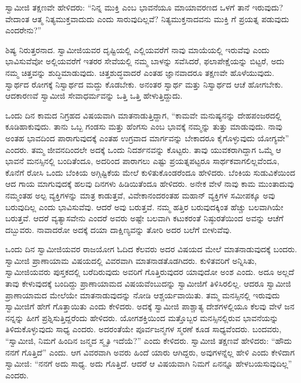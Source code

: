  ಸ್ವಾಮೀಜಿ ತಕ್ಷಣವೇ ಹೇಳಿದರು: “ನಿನ್ನ ಮುಕ್ತಿ ಎಂಬ ಭಾವನೆಯೂ ಮಾಯಾವರಣದ ಒಳಗೆ ತಾನೆ ಇರುವುದು? ವೇದಾಂತ ಆತ್ಮ ನಿತ್ಯಮುಕ್ತವಾದುದು ಎಂದು ಸಾರುವುದಿಲ್ಲವೆ? ನಿತ್ಯಮುಕ್ತನಾದವನು ಮುಕ್ತಿ ಗೆ ಪ್ರಯತ್ನ ಪಡುವುದು ಎಂದರೇನು?” 

 ಶಿಷ್ಯ ನಿರುತ್ತರನಾದ. ಸ್ವಾಮೀಜಿಯವರ ದೃಷ್ಟಿಯಲ್ಲಿ ಎಲ್ಲಿಯವರೆಗೆ ನಾವು ಮಾಯೆಯಲ್ಲಿ ಇರುವೆವು ಎಂದು ಭಾವಿಸುವೆವೋ ಅಲ್ಲಿಯವರೆಗೆ ಇತರರ ಸೇವೆಯಲ್ಲಿ ನಮ್ಮ ಬಾಳನ್ನು ಸವೆಸಿದರೆ, ಫಲಾಪೇಕ್ಷೆಯನ್ನು ಬಿಟ್ಟರೆ, ಅದು ನಮ್ಮ ಚಿತ್ತವನ್ನು ಶುದ್ಧಿಮಾಡುವುದು. ಚಿತ್ತಶುದ್ಧವಾದರೆ ಎಂತಹ ಜ್ಞಾನವಾದರೂ ತಕ್ಷಣವೇ ಹೊಳೆಯುವುದು. ಸ್ವಾರ್ಥದ ರೋಗಕ್ಕೆ ನಿಸ್ವಾರ್ಥದ ಮದ್ದು ಕೊಡಬೇಕು. ಅನಂತರ ಸ್ವಾರ್ಥ ಮತ್ತು ನಿಸ್ವಾರ್ಥದ ಆಚೆ ಹೋಗಬೇಕು. ಆದಕಾರಣವೆ ಸ್ವಾಮೀಜಿ ಸೇವಾಧರ್ಮವನ್ನು ಒತ್ತಿ ಒತ್ತಿ ಹೇಳುತ್ತಿದ್ದುದು. 

 ಒಂದು ದಿನ ಕಾಮದ ನಿಗ್ರಹದ ವಿಷಯವಾಗಿ ಮಾತನಾಡುತ್ತಿದ್ದಾಗ, “ಕಾಮವೇ ಮನುಷ್ಯನನ್ನು ದೇಹಪಂಜರದಲ್ಲಿ ಕೂಡಿಹಾಕುವುದು. ತಾನು ಒಬ್ಬ ಗಂಡಸು ಮತ್ತು ಹೆಂಗಸು ಎಂಬ ಭಾವಕ್ಕೆ ನಮ್ಮನ್ನು ತುತ್ತು ಮಾಡುವುದು. ನಾವು ಅಂತಹ ಭಾವದಿಂದ ಪಾರಾಗುವುದಕ್ಕೆ ಎಂತಹ ಉಗ್ರವಾದ ಮಾರ್ಗವನ್ನು ಬೇಕಾದರೂ ಕೈಗೊಳ್ಳುವುದು ಯೋಗ್ಯವೇ” ಎಂದರು. ತಮ್ಮ ಜೀವನದಿಂದಲೇ ಅದಕ್ಕೆ ಒಂದು ನಿದರ್ಶನವನ್ನು ಕೊಟ್ಟರು. ತಾವು ಯುವಕರಾಗಿದ್ದಾಗ ಒಮ್ಮೆ ಆ ಭಾವನೆ ಮನಸ್ಸಿನಲ್ಲಿ ಬಂದಿತೆಂದೂ, ಅದರಿಂದ ಪಾರಾಗಲು ಎಷ್ಟು ಪ್ರಯತ್ನಪಟ್ಟರೂ ಸಾರ್ಥಕವಾಗಲಿಲ್ಲವೆಂದೂ, ಕೊನೆಗೆ ರೋಸಿ ಒಂದು ಬೆಂಕಿಯ ಅಗ್ಗಿಷ್ಟಿಕೆಯ ಮೇಲೆ ಕುಳಿತುಕೊಂಡರೆಂದೂ ಹೇಳಿದರು. ಬೆಂಕಿಯ ಸುಡುವಿಕೆಯಿಂದ ಆದ ಗಾಯ ಮಾಗುವುದಕ್ಕೆ ಹಲವು ದಿನಗಳು ಹಿಡಿಯಿತೆಂದೂ ಹೇಳಿದರು. ಅನೇಕ ವೇಳೆ ನಾವು ಕಾಮ ಮುಂತಾದುವು ನಮ್ಮಂತಹ ಅಲ್ಪ ವ್ಯಕ್ತಿಗಳನ್ನು ಮಾತ್ರ ಕಾಡುತ್ತವೆ, ವಿವೇಕಾನಂದರಂತಹ ಮಹಾನ್ ವ್ಯಕ್ತಿಗಳ ಸಮೀಪಕ್ಕೂ ಅವು ಬರುವುದಿಲ್ಲ ಎಂದು ಭಾವಿಸುವೆವು. ಆದರೆ ಅವು ಬರುತ್ತವೆ. ನಮ್ಮ ಹತ್ತಿರ ಬರುವುದಕ್ಕಿಂತ ಹೆಚ್ಚು ಬಲವಾಗಿಯೇ ಬರುತ್ತವೆ. ಆದರೆ ವ್ಯತ್ಯಾಸವೇನು ಎಂದರೆ ಅವರು ಅಷ್ಟೇ ಬಲವಾಗಿ ಕಟುಕರಂತೆ ನಿಷ್ಠುರತೆಯಿಂದ ಅವನ್ನು ಆಚೆಗೆ ದಬ್ಬುವರು. ನಾವಾದರೋ ಅದಕ್ಕೆ ದಯಾ ದಾಕ್ಷಿಣ್ಯವನ್ನು ತೋರಿ ಅದರ ಬಲೆಗೆ ಬೀಳುವೆವು. 

 ಒಂದು ದಿನ ಸ್ವಾಮೀಜಿಯವರ ರಾಜಯೋಗ ಓದಿದ ಕೆಲವರು ಅದರ ವಿಷಯದ ಮೇಲೆ ಮಾತನಾಡುವುದಕ್ಕೆ ಬಂದರು. ಸ್ವಾಮೀಜಿ ಪ್ರಾಣಾಯಾಮ ವಿಷಯದಲ್ಲಿ ವಿವರವಾಗಿ ಮಾತನಾಡತೊಡಗಿದರು. ಕುಳಿತವರಿಗೆ ಅನ್ನಿಸಿತು, ಸ್ವಾಮೀಜಿಯವರು ಪುಸ್ತಕದಲ್ಲಿ ಬರೆದಿರುವುದು ಅವರಿಗೆ ಗೊತ್ತಿರುವುದರ ಯಾವುದೋ ಅಂಶ ಎಂದು. ಅದೂ ಅಲ್ಲದೆ ತಾವು ಕೇಳುವುದಕ್ಕೆ ಬಂದಿದ್ದು ಪ್ರಾಣಾಯಾಮದ ವಿಷಯವೆಂಬುದನ್ನು ಸ್ವಾಮೀಜಿಗೆ ತಿಳಿಸಿರಲಿಲ್ಲ. ಆದರೂ ಸ್ವಾಮೀಜಿ ಪ್ರಾಣಾಯಾಮದ ಮೇಲೆಯೇ ಮಾತನಾಡುವುದನ್ನು ನೋಡಿ ಆಶ್ಚರ್ಯವಾಯಿತು. ತಮ್ಮ ಮನಸ್ಸಿನಲ್ಲಿ ಇರುವುದು ಸ್ವಾಮೀಜಿಗೆ ಹೇಗೆ ಗೊತ್ತಾಯಿತು ಎಂದು ಕೇಳಿದರು. ಅದಕ್ಕೆ ಸ್ವಾಮೀಜಿ ಪಾಶ್ಚಾತ್ಯ ದೇಶಗಳಲ್ಲಿಯೂ ಕೆಲವು ವೇಳೆ ಜನ ನನ್ನನ್ನು ಹೀಗೆ ಪ್ರಶ್ನಿಸುತ್ತಿದ್ದರೆಂದು ಹೇಳಿದರು. ಯೋಗಶಕ್ತಿಯಿಂದ ಮತ್ತೊಬ್ಬರ ಮನಸ್ಸಿನಲ್ಲಿರುವ ಭಾವನೆಯನ್ನು ತಿಳಿದುಕೊಳ್ಳುವುದು ಸಾಧ್ಯ ಎಂದರು. ಅದರಂತೆಯೇ ಪೂರ್ವಜನ್ಮಗಳ ಸ್ಮರಣೆ ಕೂಡ ಸಾಧ್ಯವೆಂದರು. ಬಂದವರು, “ಸ್ವಾಮೀಜಿ, ನಿಮಗೆ ಹಿಂದಿನ ಜನ್ಮದ ಸ್ಮೃತಿ ಇದೆಯೆ?” ಎಂದು ಕೇಳಿದರು. ಸ್ವಾಮೀಜಿ ತಕ್ಷಣವೆ ಹೇಳಿದರು: “ಹೌದು ನನಗೆ ಗೊತ್ತಿದೆ” ಎಂದು. ಆಗ ವಿವರವಾಗಿ ಅವರು ಹಿಂದೆ ಯಾರು ಆಗಿದ್ದರು, ಅವುಗಳನ್ನೆಲ್ಲ ಹೇಳಿ ಎಂದು ಕೇಳಿದಾಗ ಸ್ವಾಮೀಜಿ: “ನನಗೆ ಅದು ಸಾಧ್ಯ. ಅದು ಗೊತ್ತಿದೆ. ಆದರೆ ಆ ವಿಷಯವಾಗಿ ನಿಮಗೆ ಏನನ್ನೂ ಹೇಳಬಯಸುವುದಿಲ್ಲ” ಎಂದರು. 

